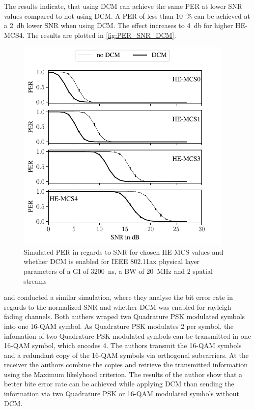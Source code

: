 The results indicate, that using \ac{DCM} can achieve the same \ac{PER} at lower \ac{SNR} values compared to not using \ac{DCM}. A \ac{PER} of less than \SI{10}{\percent} can be achieved at
a \SI{2}{\decibel} lower \ac{SNR} when using \ac{DCM}. The effect increases to \SI{4}{\decibel} for higher HE-\ac{MCS}\num{4}. The results are plotted in \autoref{fig:PER_SNR_DCM}.
\begin{figure}[H]%
	\centering
	\includegraphics[width=0.95\textwidth]{figures/DCM_PER_to_SNR.pdf}
	\caption{Simulated \ac{PER} in regards to \ac{SNR} for chosen HE-\ac{MCS} values and whether \ac{DCM} is enabled for IEEE 802.11ax physical layer parameters of a \ac{GI} of \SI{3200}{\nano\second}, a \ac{BW} of \SI{20}{\mega\hertz} and 2 spatial streams}%
	\label{fig:PER_SNR_DCM}%
\end{figure}


\Textcite{ryu_ber_2010} and \textcite{park_ber_2006} conducted a similar simulation, where they analyse the bit error rate in
regards to the normalized \ac{SNR} and whether \ac{DCM} was enabled for rayleigh fading channels. Both authers wraped two
Quadrature \ac{PSK} modulated symbols into one 16-\ac{QAM} symbol. As Quadrature \ac{PSK} modulates \SI{2}{\bit} per symbol, the infomation
of two Quadrature \ac{PSK} modulated symbols can be
transmitted in one 16-\ac{QAM} symbol, which encodes \SI{4}{\bit}. The authors transmit the 16-\ac{QAM} symbols and a redundant copy
of the 16-\ac{QAM} symbols via orthogonal subcarriers. At the receiver the authors combine the copies and retrieve the transmitted
information using the Maximum likelyhood criterion. The results of the author show that a better bite error rate can be achieved while applying
\ac{DCM} than sending the information via two Quadrature \ac{PSK} or 16-\ac{QAM} modulated symbols without \ac{DCM}.

